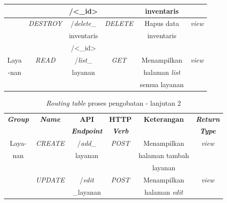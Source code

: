 \begin{enumerate}
\begin{table}[H]
\begin{tabular}{|c|c|c|c|c|c|}
			& 
			&
			/<\_id>&
			&
			inventaris &
			\\
			\hline
			
			& 
			\emph{DESTROY} &
			/\emph{delete}\_&
			\emph{DELETE} &
			Hapus data &
			\emph{view}\\
			
			& 
			&
			inventaris&
			&
			inventaris &
			\\
			
			& 
			&
			/<\_id>&
			&
			&
			\\
			
			\hline
			
			Laya & 
			\emph{READ} &
			/\emph{list}\_ &
			\emph{GET} &
			Menampilkan &
			\emph{view}\\
			
			-nan& 
			&
			layanan&
			&
			halaman \emph{list} &
			\\
			
			& 
			&
			&
			&
			semua layanan &
			\\
			\hline
			
		\end{tabular}
	\end{table}
	
	\begin{table}[H]
		\centering
		\caption{\emph{Routing table} proses pengobatan - lanjutan 2}
		\label{tabel_input}
		\begin{tabular}{|c|c|c|c|c|c|}
			\hline
			\textbf{\emph{Group}} & \textbf{\emph{Name}} & \textbf{API} & \textbf{HTTP} & \textbf{Keterangan} & \textbf{\emph{Return}} \\
			
			& & \textbf{\emph{Endpoint}} & \textbf{\emph{Verb}} & & \textbf{\emph{Type}} \\
			\hline
	
			Laya-& 
			\emph{CREATE} &
			/\emph{add}\_&
			\emph{POST} &
			Menampilkan&
			\emph{view}\\
			
			nan& 
			&
			layanan&
			&
			halaman tambah&
			\\
			
			& 
			&
			&
			&
			layanan&
			\\
			\hline
			
			& 
			\emph{UPDATE} &
			/\emph{edit}&
			\emph{POST} &
			Menampilkan&
			\emph{view}\\
			
			& 
			&
			\_layanan&
			&
			halaman \emph{edit}&
			\\
			

\end{tabular}
\end{table}
\end{enumerate}
